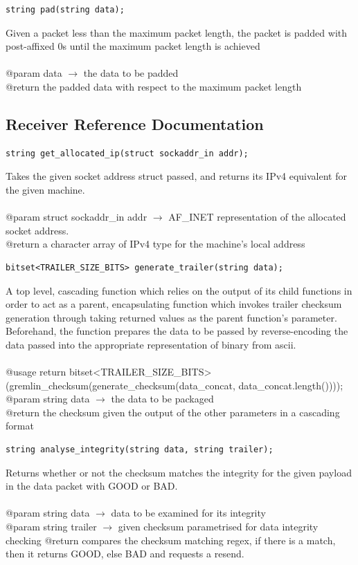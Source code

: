 \documentclass[12pt]{article}
\begin{document}
\begin{lstlisting}
string pad(string data);
\end{lstlisting}
Given a packet less than the maximum packet length, the packet is padded with post-affixed 0s until the maximum packet length is achieved\\\\
@param data $\rightarrow$ the data to be padded\\
@return the padded data with respect to the maximum packet length
\clearpage

\subsection{Receiver Reference Documentation}
\begin{lstlisting}
string get_allocated_ip(struct sockaddr_in addr);
\end{lstlisting}
Takes the given socket address struct passed, and returns its IPv4 equivalent for the given machine.\\\\
@param struct sockaddr\_in addr $\rightarrow$ AF\_INET representation of the allocated socket address.\\
@return a character array of IPv4 type for the machine's local address

\begin{lstlisting}
bitset<TRAILER_SIZE_BITS> generate_trailer(string data);
\end{lstlisting}
A top level, cascading function which relies on the output of its child functions in order to act as a parent, encapsulating function which invokes trailer checksum generation through taking returned values as the parent function's parameter. Beforehand, the function prepares the data to be passed by reverse-encoding the data passed into the appropriate representation of binary from ascii.\\\\
@usage return bitset<TRAILER\_SIZE\_BITS>(gremlin\_checksum(generate\_checksum(data\_concat, data\_concat.length())));\\
@param string data $\rightarrow$ the data to be packaged\\
@return the checksum given the output of the other parameters in a cascading format

\begin{lstlisting}
string analyse_integrity(string data, string trailer);
\end{lstlisting}
Returns whether or not the checksum matches the integrity for the given payload in the data packet with GOOD or BAD.\\\\
@param string data $\rightarrow$ data to be examined for its integrity\\
@param string trailer $\rightarrow$ given checksum parametrised for data integrity checking
@return compares the checksum matching regex, if there is a match, then it returns GOOD, else BAD and requests a resend.
\end{document}

